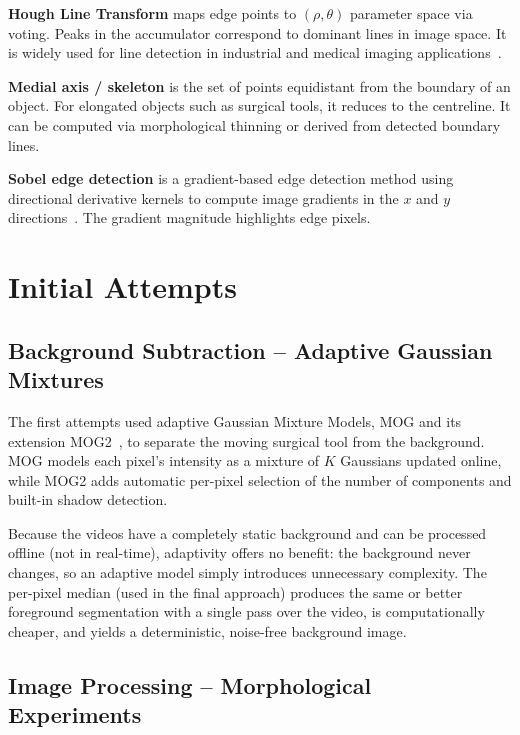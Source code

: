 \documentclass[conference, twocolumn]{IEEEtran}
\begin{document}
\textbf{Hough Line Transform} maps edge points to $(\rho, \theta)$ parameter space via voting. Peaks in the accumulator correspond to dominant lines in image space. It is widely used for line detection in industrial and medical imaging applications~\cite{opencv}.

\textbf{Medial axis / skeleton} is the set of points equidistant from the boundary of an object. For elongated objects such as surgical tools, it reduces to the centreline. It can be computed via morphological thinning or derived from detected boundary lines.

\textbf{Sobel edge detection} is a gradient-based edge detection method using directional derivative kernels to compute image gradients in the $x$ and $y$ directions~\cite{opencv}. The gradient magnitude highlights edge pixels.

\section{Initial Attempts}

\subsection{Background Subtraction -- Adaptive Gaussian Mixtures}

The first attempts used adaptive Gaussian Mixture Models, MOG and its extension MOG2~\cite{opencv}, to separate the moving surgical tool from the background. MOG models each pixel's intensity as a mixture of $K$ Gaussians updated online, while MOG2 adds automatic per-pixel selection of the number of components and built-in shadow detection.

Because the videos have a completely static background and can be processed offline (not in real-time), adaptivity offers no benefit: the background never changes, so an adaptive model simply introduces unnecessary complexity. The per-pixel median (used in the final approach) produces the same or better foreground segmentation with a single pass over the video, is computationally cheaper, and yields a deterministic, noise-free background image.

\subsection{Image Processing -- Morphological Experiments}
\end{document}
